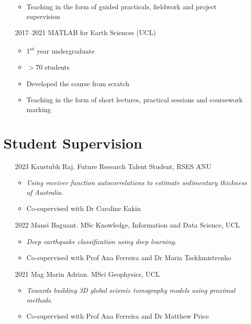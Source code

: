 \begin{itemize}
\begin{itemize}
            \item Teaching in the form of guided practicals, fieldwork and project supervision
        \end{itemize}
    \item[2017--2021] MATLAB for Earth Sciences (UCL)
        \begin{itemize}
            \item 1\textsuperscript{st} year undergraduate
            \item \(>\)70 students
            \item Developed the course from scratch
            \item Teaching in the form of short lectures, practical sessions and coursework marking
        \end{itemize}
\end{itemize}

\section{Student Supervision}

\begin{itemize}
    \item[2023] Kaustubh Raj. Future Research Talent Student, RSES ANU
        \begin{itemize}
            \item \textit{Using receiver function autocorrelations to estimate sedimentary thickness of Australia.}
            \item Co-supervised with Dr Caroline Eakin
        \end{itemize}
    \item[2022] Mansi Baguant. MSc Knowledge, Information and Data Science, UCL
        \begin{itemize}
            \item \textit{Deep earthquake classification using deep learning.}
            \item Co-supervised with Prof Ana Ferreira and Dr Maria Tsekhmistrenko
        \end{itemize}
    \item[2021] Mag Marin Adrian. MSci Geophysics, UCL
        \begin{itemize}
            \item \textit{Towards building 3D global seismic tomography models using proximal methods.}
            \item Co-supervised with Prof Ana Ferreira and Dr Matthew Price
        \end{itemize}
\end{itemize}

